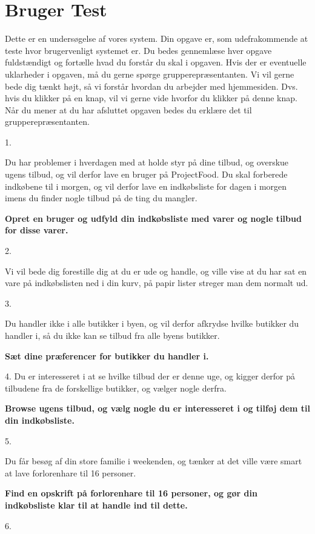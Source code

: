 \chapter{Bruger Test}

Dette er en undersøgelse af vores system. Din opgave er, som udefrakommende at teste hvor brugervenligt systemet er. Du bedes gennemlæse hver opgave fuldstændigt og fortælle hvad du forstår du skal i opgaven. Hvis der er eventuelle uklarheder i opgaven, må du gerne spørge grupperepræsentanten. Vi vil gerne bede dig tænkt højt, så vi forstår hvordan du arbejder med hjemmesiden. Dvs. hvis du klikker på en knap, vil vi gerne vide hvorfor du klikker på denne knap. Når du mener at du har afsluttet opgaven bedes du erklære det til grupperepræsentanten.

1.

Du har problemer i hverdagen med at holde styr på dine tilbud, og overskue ugens tilbud, og vil derfor lave en bruger på ProjectFood. Du skal forberede indkøbene til i morgen, og vil derfor lave en indkøbsliste for dagen i morgen imens du finder nogle tilbud på de ting du mangler.

\textbf{Opret en bruger og udfyld din indkøbsliste med varer og nogle tilbud for disse varer.}

2. 

Vi vil bede dig forestille dig at du er ude og handle, og ville vise at du har sat en vare på indkøbslisten ned i din kurv, på papir lister streger man dem normalt ud.

3.

Du handler ikke i alle butikker i byen, og vil derfor afkrydse hvilke butikker du handler i, så du ikke kan se tilbud fra alle byens butikker.

\textbf{Sæt dine præferencer for butikker du handler i.}

4.
Du er interesseret i at se hvilke tilbud der er denne uge, og kigger derfor på tilbudene fra de forskellige butikker, og vælger nogle derfra.

\textbf{Browse ugens tilbud, og vælg nogle du er interesseret i og tilføj dem til din indkøbsliste.}

5.

Du får besøg af din store familie i weekenden, og tænker at det ville være smart at lave forlorenhare til 16 personer. 

\textbf{Find en opskrift på forlorenhare til 16 personer, og gør din indkøbsliste klar til at handle ind til dette.}

6. 

